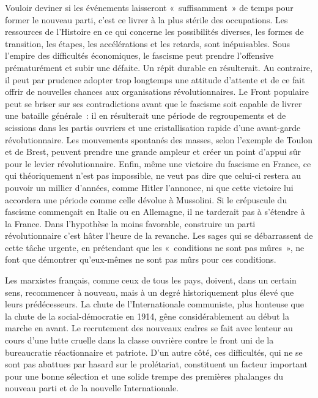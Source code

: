 \documentclass[french,twoside]{book} %
\begin{document}
Vouloir deviner si les événements laisseront « suffisamment » de temps pour former le nouveau parti, c’est ce livrer à la plus stérile des occupations. Les ressources  de l’Histoire en ce qui concerne les possibilités diverses, les formes de transition, les étapes, les accélérations et les retards, sont inépuisables. Sous l’empire des difficultés économiques, le fascisme peut prendre l’offensive prématurément et subir une défaite. Un répit durable en résulterait. Au contraire, il peut par prudence adopter trop longtemps une attitude d’attente et de ce fait offrir de nouvelles chances aux organisations révolutionnaires. Le Front populaire peut se briser sur ses contradictions avant que le fascisme soit capable de livrer une bataille générale : il en résulterait une période de regroupements et de scissions dans les partis ouvriers et une cristallisation rapide d’une avant-garde révolutionnaire. Les mouvements spontanés des masses, selon l’exemple de Toulon et de Brest, peuvent prendre une grande ampleur et créer un point d’appui sûr pour le levier révolutionnaire. Enfin, même une victoire du fascisme en France, ce qui théoriquement n’est pas impossible, ne veut pas dire que celui-ci restera au pouvoir un millier d’années, comme Hitler l’annonce, ni que cette victoire lui accordera une période comme celle dévolue à Mussolini. Si le crépuscule du fascisme commençait en Italie ou en Allemagne, il ne tarderait pas à s’étendre à la France. Dans l’hypothèse la moins favorable, construire un parti révolutionnaire c’est hâter l’heure de la revanche. Les sages qui se débarrassent de cette tâche urgente, en prétendant que les « conditions ne sont pas mûres », ne font que démontrer qu’eux-mêmes ne sont pas mûrs pour ces conditions.\par
Les marxistes français, comme ceux de tous les pays, doivent, dans un certain sens, recommencer à nouveau, mais à un degré historiquement plus élevé que leurs prédécesseurs. La chute de l’Internationale communiste, plus honteuse que la chute de la social-démocratie en 1914, gêne considérablement au début la marche en avant. Le recrutement des nouveaux cadres se fait avec lenteur au  cours d’une lutte cruelle dans la classe ouvrière contre le front uni de la bureaucratie réactionnaire et patriote. D’un autre côté, ces difficultés, qui ne se sont pas abattues par hasard sur le prolétariat, constituent un facteur important pour une bonne sélection et une solide trempe des premières phalanges du nouveau parti et de la nouvelle Internationale.\par
\end{document}
